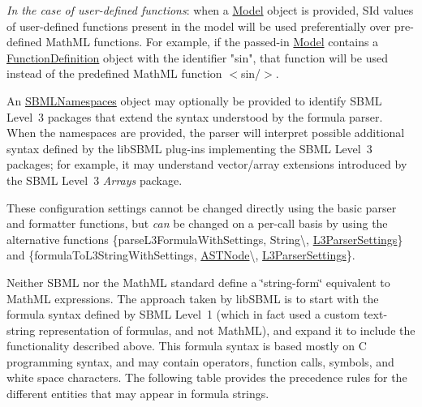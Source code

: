 \begin{DoxyItemize}
\begin{DoxyItemize}
\begin{DoxyItemize}
\item {\itshape In the case of user-\/defined functions}\+: when a \hyperlink{class_model}{Model} object is provided, {\ttfamily S\+Id} values of user-\/defined functions present in the model will be used preferentially over pre-\/defined Math\+ML functions. For example, if the passed-\/in \hyperlink{class_model}{Model} contains a \hyperlink{class_function_definition}{Function\+Definition} object with the identifier "{\ttfamily sin}", that function will be used instead of the predefined Math\+ML function {\ttfamily $<$sin/$>$}. 
\end{DoxyItemize}


\item An \hyperlink{class_s_b_m_l_namespaces}{S\+B\+M\+L\+Namespaces} object may optionally be provided to identify S\+B\+ML Level~3 packages that extend the syntax understood by the formula parser. When the namespaces are provided, the parser will interpret possible additional syntax defined by the lib\+S\+B\+ML plug-\/ins implementing the S\+B\+ML Level~3 packages; for example, it may understand vector/array extensions introduced by the S\+B\+ML Level~3 {\itshape Arrays} package. 
\end{DoxyItemize}\end{DoxyItemize}
These configuration settings cannot be changed directly using the basic parser and formatter functions, but {\itshape can} be changed on a per-\/call basis by using the alternative functions \{parse\+L3\+Formula\+With\+Settings, String\textbackslash{}, \hyperlink{class_l3_parser_settings}{L3\+Parser\+Settings}\} and \{formula\+To\+L3\+String\+With\+Settings, \hyperlink{class_a_s_t_node}{A\+S\+T\+Node}\textbackslash{}, \hyperlink{class_l3_parser_settings}{L3\+Parser\+Settings}\}.

Neither S\+B\+ML nor the Math\+ML standard define a \char`\"{}string-\/form\char`\"{} equivalent to Math\+ML expressions. The approach taken by lib\+S\+B\+ML is to start with the formula syntax defined by S\+B\+ML Level~1 (which in fact used a custom text-\/string representation of formulas, and not Math\+ML), and expand it to include the functionality described above. This formula syntax is based mostly on C programming syntax, and may contain operators, function calls, symbols, and white space characters. The following table provides the precedence rules for the different entities that may appear in formula strings.



